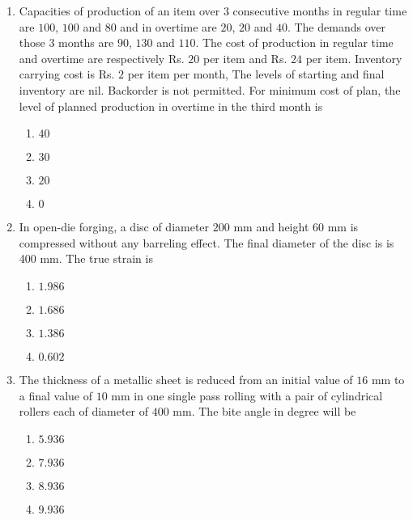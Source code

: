\documentclass[journal]{IEEEtran}
\begin{document}
\begin{enumerate}[start = 52]
    \item Capacities of production of an item over $3$ consecutive months in regular time are $100$, $100$ and $80$ and in overtime are $20$, $20$ and $40$. The demands over those $3$ months are $90$, $130$ and $110$. The cost of production in regular time and overtime are respectively Rs. $20$ per item and Rs. $24$ per item. Inventory carrying cost is Rs. $2$ per item per month, The levels of starting and final inventory are nil. Backorder is not permitted. For minimum cost of plan, the level of planned production in overtime in the third month is
    \begin{multicols}{4}
        \begin{enumerate}
            \item $40$
            \item $30$
            \item $20$
            \item $0$
        \end{enumerate}
    \end{multicols}

    \item In open-die forging, a disc of diameter $200$ mm and height $60$ mm is compressed without any barreling effect. The final diameter of the disc is is 400 mm. The true strain is 
    \begin{multicols}{4}
        \begin{enumerate}
            \item $1.986$
            \item $1.686$
            \item $1.386$
            \item $0.602$
        \end{enumerate}
    \end{multicols}

    \item The thickness of a metallic sheet is reduced from an initial value of $16$ mm to a final value of $10$ mm in one single pass rolling with a pair of cylindrical rollers each of diameter of $400$ mm. The bite angle in degree will be
    \begin{multicols}{4}
        \begin{enumerate}
            \item $5.936$
            \item $7.936$
            \item $8.936$
            \item $9.936$
        \end{enumerate}
    \end{multicols}


\end{enumerate}
\end{document}
